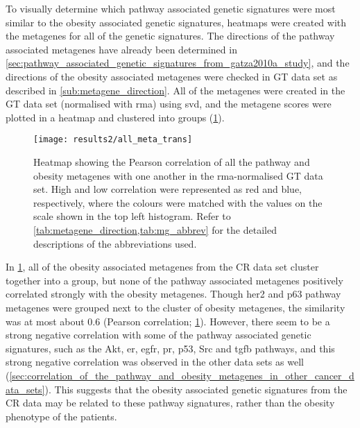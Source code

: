 To visually determine which pathway associated genetic signatures were most similar to the obesity associated genetic signatures, heatmaps were created with the metagenes for all of the genetic signatures.
The directions of the pathway associated metagenes have already been determined in \cref{sec:pathway_associated_genetic_signatures_from_gatza2010a_study}, and the directions of the obesity associated metagenes were checked in GT data set as described in \cref{sub:metagene_direction}.
All of the metagenes were created in the GT data set (normalised with \gls{rma}) using \gls{svd}, and the metagene scores were plotted in a heatmap and clustered into groups (\cref{fig:gatza_allmeta}).

\begin{figure}[htpb]
	\centering
	\texttt{[image: results2/all\_meta\_trans]}
	\caption[Heatmap of the Pearson correlation of all the pathway and obesity metagenes with one another in the \acrshort{rma}-normalised GT data]{Heatmap showing the Pearson correlation of all the pathway and obesity metagenes  with one another  in the \gls{rma}-normalised GT data set.
		High and low correlation were represented as red and blue, respectively, where the colours were matched with the values on the scale shown in the top left histogram.
		Refer to \cref{tab:metagene_direction,tab:mg_abbrev} for the detailed descriptions of the abbreviations used.
		}
	\label{fig:gatza_allmeta}
\end{figure}

In \cref{fig:gatza_allmeta}, all of the obesity associated metagenes from the CR data set cluster together into a group, but none of the pathway associated metagenes positively correlated strongly with the obesity metagenes.
Though \gls{her2} and p63 pathway metagenes were grouped next to the cluster of obesity metagenes, the similarity was at most about 0.6  (Pearson correlation; \cref{fig:gatza_allmeta}).
However, there seem to be a strong negative correlation with some of the pathway associated genetic signatures, such as the Akt, \gls{er}, \gls{egfr}, \gls{pr}, p53, Src and \gls{tgfb} pathways, and this strong negative correlation was observed in the other data sets as well (\cref{sec:correlation_of_the_pathway_and_obesity_metagenes_in_other_cancer_data_sets}).
This suggests that the obesity associated genetic signatures from the CR data may be related to these pathway signatures, rather than the obesity phenotype of the patients.

